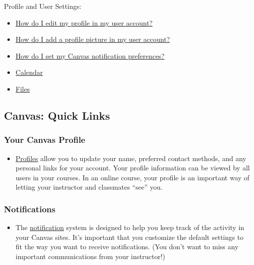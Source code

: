 \documentclass[
]{book}
\providecommand{\tightlist}{%
  \setlength{\itemsep}{0pt}\setlength{\parskip}{0pt}}
\begin{document}
Profile and User Settings:

\begin{itemize}
\item
  \href{https://community.canvaslms.com/t5/Student-Guide/How-do-I-edit-my-profile-in-my-user-account-as-a-student/ta-p/421}{How do I edit my profile in my user account?}
\item
  \href{https://community.canvaslms.com/t5/Student-Guide/How-do-I-add-a-profile-picture-in-my-user-account-as-a-student/ta-p/518}{How do I add a profile picture in my user account?}
\item
  \href{https://community.canvaslms.com/t5/Student-Guide/How-do-I-manage-my-Canvas-notification-settings-as-a-student/ta-p/434}{How do I set my Canvas notification preferences?}
\item
  \href{https://vimeo.com/78015141}{Calendar}
\item
  \href{https://vimeo.com/74772644}{Files}
\end{itemize}

\hypertarget{canvas-quick-links}{%
\subsection{Canvas: Quick Links}\label{canvas-quick-links}}

\hypertarget{your-canvas-profile}{%
\subsubsection{Your Canvas Profile}\label{your-canvas-profile}}

\begin{itemize}
\tightlist
\item
  \href{https://community.canvaslms.com/t5/Student-Guide/How-do-I-edit-my-profile-in-my-user-account-as-a-student/ta-p/421}{Profiles} allow you to update your name, preferred contact methods, and any personal links for your account. Your profile information can be viewed by all users in your courses. In an online course, your profile is an important way of letting your instructor and classmates ``see'' you.
\end{itemize}

\hypertarget{notifications}{%
\subsubsection{Notifications}\label{notifications}}

\begin{itemize}
\tightlist
\item
  The \href{https://community.canvaslms.com/t5/Student-Guide/How-do-I-manage-my-Canvas-notification-settings-as-a-student/ta-p/434}{notification} system is designed to help you keep track of the activity in your Canvas sites. It's important that you customize the default settings to fit the way you want to receive notifications. (You don't want to miss any important communications from your instructor!)
\end{itemize}
\end{document}

